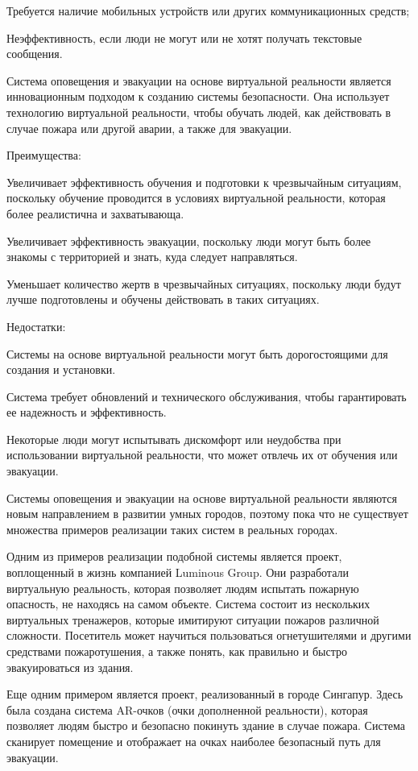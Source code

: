 \begin{multicols}{2}
Требуется наличие мобильных устройств или других коммуникационных
средств;

Неэффективность, если люди не могут или не хотят получать текстовые
сообщения.

Система оповещения и эвакуации на основе виртуальной реальности является
инновационным подходом к созданию системы безопасности. Она использует
технологию виртуальной реальности, чтобы обучать людей, как действовать
в случае пожара или другой аварии, а также для эвакуации.

Преимущества:

Увеличивает эффективность обучения и подготовки к чрезвычайным
ситуациям, поскольку обучение проводится в условиях виртуальной
реальности, которая более реалистична и захватывающа.

Увеличивает эффективность эвакуации, поскольку люди могут быть более
знакомы с территорией и знать, куда следует направляться.

Уменьшает количество жертв в чрезвычайных ситуациях, поскольку люди
будут лучше подготовлены и обучены действовать в таких ситуациях.

Недостатки:

Системы на основе виртуальной реальности могут быть дорогостоящими для
создания и установки.

Система требует обновлений и технического обслуживания, чтобы
гарантировать ее надежность и эффективность.

Некоторые люди могут испытывать дискомфорт или неудобства при
использовании виртуальной реальности, что может отвлечь их от обучения
или эвакуации.

Системы оповещения и эвакуации на основе виртуальной реальности являются
новым направлением в развитии умных городов, поэтому пока что не
существует множества примеров реализации таких систем в реальных
городах.

Одним из примеров реализации подобной системы является проект,
воплощенный в жизнь компанией Luminous Group. Они разработали
виртуальную реальность, которая позволяет людям испытать пожарную
опасность, не находясь на самом объекте. Система состоит из нескольких
виртуальных тренажеров, которые имитируют ситуации пожаров различной
сложности. Посетитель может научиться пользоваться огнетушителями и
другими средствами пожаротушения, а также понять, как правильно и быстро
эвакуироваться из здания.

Еще одним примером является проект, реализованный в городе Сингапур.
Здесь была создана система AR-очков (очки дополненной реальности),
которая позволяет людям быстро и безопасно покинуть здание в случае
пожара. Система сканирует помещение и отображает на очках наиболее
безопасный путь для эвакуации.


\end{multicols}
